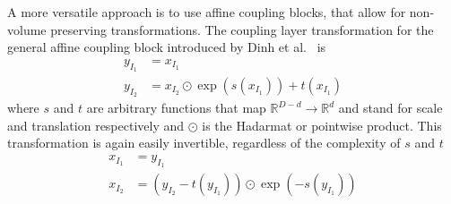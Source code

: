 A more versatile approach is to use affine coupling blocks, that allow for
non-volume preserving transformations. The coupling layer transformation for
the general affine coupling block introduced by Dinh et
al.~\citep{dinhDensityEstimationUsing2017} is
\begin{equation}
    \begin{aligned}%
        \label{eq:affine_coupling_transform}
        y_{I_1} &= x_{I_1} \\
        y_{I_2} &= x_{I_2} \odot \exp ( s(x_{I_1})) + t(x_{I_1})
    \end{aligned}
\end{equation}
where $s$ and $t$ are arbitrary functions that map $\mathbb{R}^{D-d}
\rightarrow \mathbb{R}^d$ and stand for scale and translation respectively and
$\odot$ is the Hadarmat or pointwise product.
This transformation is again easily invertible, regardless of the complexity of
$s$ and $t$
\begin{equation}
    \begin{aligned}%
        \label{eq:inv_affine_coupling_transform}
        x_{I_1} &= y_{I_1} \\
        x_{I_2} &= (y_{I_2} - t(y_{I_1})) \odot \exp (-s(y_{I_1}))
    \end{aligned}
\end{equation}

